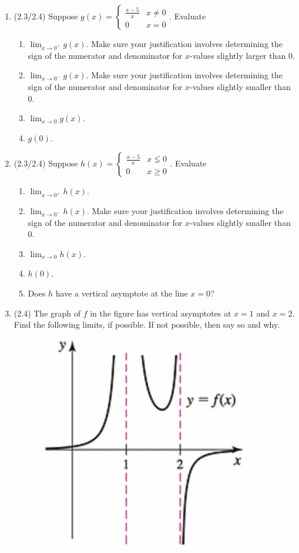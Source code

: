 \documentclass[11pt,letterpaper]{article}
\begin{document}
\begin{enumerate}
\item (2.3/2.4) Suppose $g(x)=\begin{cases}\frac{x-5}{x} & x\neq 0 \\
	0 & x=0 \end{cases}$.  Evaluate 
	\begin{enumerate}
	\item $\lim_{x\to 0^+}g(x)$.  Make sure your justification involves determining the sign of the numerator and denominator for $x$-values slightly larger than 0.
	\item $\lim_{x\to 0^-}g(x)$.  Make sure your justification involves determining the sign of the numerator and denominator for $x$-values slightly smaller than 0.
	\item $\lim_{x\to 0}g(x)$.
	\item $g(0)$.
	\end{enumerate}
\item (2.3/2.4) Suppose $h(x)=\begin{cases}\frac{x-5}{x} & x\lneq 0 \\
	0 & x\geq 0 \end{cases}$.  Evaluate 
	\begin{enumerate}
	\item $\lim_{x\to 0^+}h(x)$.  
	\item $\lim_{x\to 0^-}h(x)$.  Make sure your justification involves determining the sign of the numerator and denominator for $x$-values slightly smaller than 0.
	\item $\lim_{x\to 0}h(x)$.
	\item $h(0)$.
	\item Does $h$ have a vertical asymptote at the line $x=0$?
	\end{enumerate}	
\item (2.4) The graph of $f$ in the figure has vertical asymptotes at $x=1$ and $x=2$.  Find the following limits, if possible.  If not possible, then say so and why.
\vspace{-1pc}  
\begin{figure}[h]
\begin{center}
\includegraphics[scale=0.6]{Exam1pic3.png}

\end{center}
\end{figure}
\end{enumerate}
\end{document}
